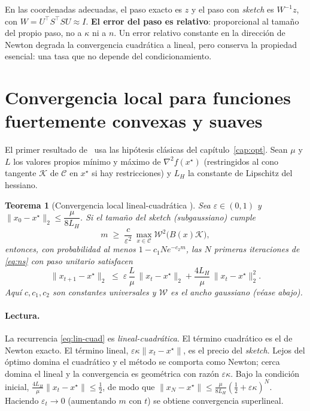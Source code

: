 \documentclass[11pt,a4paper,oneside]{book}
\newtheorem{teorema}{Teorema}[chapter]
\theoremstyle{definition}
\theoremstyle{remark}
\newcommand{\cK}{\mathcal{K}}
\newcommand{\cC}{\mathcal{C}}
\newcommand{\cW}{\mathcal{W}}
\newcommand{\T}{^{\top}}
\newcommand{\eps}{\varepsilon}
\newcommand{\nrm}[1]{\lVert #1\rVert}
\newcommand{\LH}{L_{H}}
\begin{document}
\begin{ideaclave}
En las coordenadas adecuadas, el paso exacto es $z$ y el paso con \emph{sketch} es $W^{-1}z$, con
$W=U\T S\T SU\approx I$. \textbf{El error del paso es relativo}: proporcional al tamaño del propio paso, no a
$\kappa$ ni a $n$. Un error relativo constante en la dirección de Newton degrada la convergencia cuadrática a
lineal, pero conserva la propiedad esencial: una tasa que no depende del condicionamiento.
\end{ideaclave}

\section{Convergencia local para funciones fuertemente convexas y suaves}

El primer resultado de~\cite{PW17} usa las hipótesis clásicas del capítulo~\ref{cap:opt}. Sean $\mu$ y $L$ los
valores propios mínimo y máximo de $\nabla^2 f(x^\star)$ (restringidos al cono tangente $\cK$ de $\cC$ en $x^\star$
si hay restricciones) y $\LH$ la constante de Lipschitz del hessiano.

\begin{teorema}[Convergencia local lineal-cuadrática {\cite[Teorema~1]{PW17}}]\label{teo:pw1}
Sea $\eps\in(0,1)$ y $\nrm{x_0-x^\star}_2\le\dfrac{\mu}{8\LH}$. Si el tamaño del \emph{sketch} (subgaussiano) cumple
\[ m\;\ge\;\frac{c}{\eps^2}\,\max_{x\in\cC}\cW^2\bigl(B(x)\cK\bigr), \]
entonces, con probabilidad al menos $1-c_1Ne^{-c_2m}$, las $N$ primeras iteraciones de \eqref{eq:ns} con paso
unitario satisfacen
\begin{equation}\label{eq:lin-cuad}
  \nrm{x_{t+1}-x^\star}_2\;\le\;\eps\,\frac{L}{\mu}\,\nrm{x_t-x^\star}_2+\frac{4\LH}{\mu}\,\nrm{x_t-x^\star}_2^2 .
\end{equation}
Aquí $c,c_1,c_2$ son constantes universales y $\cW$ es el ancho gaussiano (véase abajo).
\end{teorema}

\paragraph{Lectura.} La recurrencia \eqref{eq:lin-cuad} es \emph{lineal-cuadrática}. El término cuadrático es
el de Newton exacto. El término lineal, $\eps\kappa\nrm{x_t-x^\star}$, es el precio del \emph{sketch}. Lejos del
óptimo domina el cuadrático y el método se comporta como Newton; cerca domina el lineal y la convergencia es
geométrica con razón $\eps\kappa$. Bajo la condición inicial, $\frac{4\LH}{\mu}\nrm{x_t-x^\star}\le\frac12$, de modo
que $\nrm{x_N-x^\star}\le\frac{\mu}{8\LH}(\frac12+\eps\kappa)^N$. Haciendo $\eps_t\to0$ (aumentando $m$ con $t$) se
obtiene convergencia superlineal.
\end{document}
